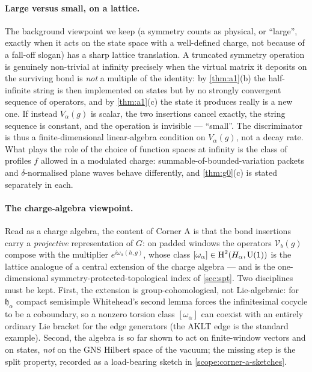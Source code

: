\paragraph*{Large versus small, on a lattice.}
The background viewpoint we keep (a symmetry counts as physical, or ``large'',
exactly when it acts on the state space with a well-defined charge, not because
of a fall-off slogan) has a sharp lattice translation.  A truncated symmetry
operation is genuinely non-trivial at infinity precisely when the virtual matrix
it deposits on the surviving bond is \emph{not} a multiple of the identity: by
\cref{thm:a1}(b) the half-infinite string is then implemented on states but by no
strongly convergent sequence of operators, and by \cref{thm:a1}(c) the state it
produces really is a new one.  If instead $V_\alpha(g)$ is scalar, the two
insertions cancel exactly, the string sequence is constant, and the operation is
invisible --- ``small''.  The discriminator is thus a finite-dimensional
linear-algebra condition on $V_\alpha(g)$, not a decay rate.  What plays the role
of the choice of function spaces at infinity is the class of profiles $f$
allowed in a modulated charge: summable-of-bounded-variation packets and
$\delta$-normalised plane waves behave differently, and \cref{thm:g0}(c) is
stated separately in each.

\paragraph*{The charge-algebra viewpoint.}
Read as a charge algebra, the content of Corner A is that the bond insertions
carry a \emph{projective} representation of $G$: on padded windows the operators
$\mathcal{V}_b(g)$ compose with the multiplier $e^{i\omega_\alpha(h,g)}$, whose
class $[\omega_\alpha]\in \operatorname{H}^2(H_\alpha,\operatorname{U}(1))$ is the lattice analogue of a
central extension of the charge algebra --- and is the one-dimensional
symmetry-protected-topological index of \cref{sec:spt}.  Two disciplines must be
kept.  First, the extension is group-cohomological, not Lie-algebraic: for
$\mathfrak{h}_\alpha$ compact semisimple Whitehead's second lemma forces the
infinitesimal cocycle to be a coboundary, so a nonzero torsion class
$[\omega_\alpha]$ can coexist with an entirely ordinary Lie bracket for the
edge generators (the AKLT edge is the standard example).  Second, the algebra is
so far shown to act on finite-window vectors and on states, \emph{not} on the
GNS Hilbert space of the vacuum; the missing step is the split property, recorded
as a load-bearing sketch in \cref{scope:corner-a-sketches}.

